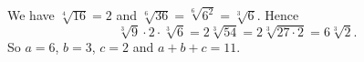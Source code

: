 We have $\sqrt[4]{16}=2$ and $\sqrt[6]{36}=\sqrt[6]{6^2}=\sqrt[3]{6}$. Hence
\[\sqrt[3]{9}\cdot2\cdot\sqrt[3]{6}=2\sqrt[3]{54}=2\sqrt[3]{27\cdot2}=6\sqrt[3]{2}.\]
So $a=6$, $b=3$, $c=2$ and $a+b+c=\boxed{11}$.
